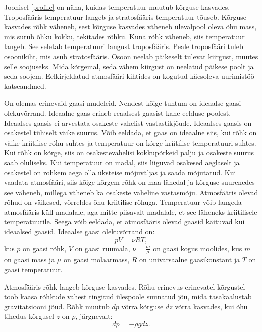 \documentclass{trkut}%
\begin{document}
Joonisel \ref{profile} on näha, kuidas temperatuur muutub kõrguse kasvades. Troposfääris temperatuur langeb ja stratosfääris temperatuur tõuseb. Kõrguse kasvades rõhk väheneb, sest kõrguse kasvades väheneb ülevalpool oleva õhu mass, mis surub õhku kokku, tekitades rõhku. Kuna rõhk väheneb, siis temperatuur langeb. See seletab temperatuuri langust troposfääris. Peale troposfääri tuleb osoonikiht, mis asub stratosfääris. Osoon neelab päikeselt tulevat kiirgust, muutes selle soojuseks. Mida kõrgemal, seda vähem kiirgust on neelatud päikese poolt ja seda soojem. Eelkirjeldatud atmosfääri kihtides on kogutud käesoleva uurimistöö katseandmed.

On olemas erinevaid gaasi mudeleid. Nendest kõige tuntum on ideaalse gaasi olekuvõrrand. Ideaalne gaas erineb reaalsest gaasist kahe eelduse poolest. Ideaalses gaasis ei arvestata osakeste vahelist vastastikjõude. Ideaalses gaasis on osakestel tühiselt väike suurus. Võib eeldada, et gaas on ideaalne siis, kui rõhk on väike kriitilise rõhu suhtes ja temperatuur on kõrge kriitilise temperatuuri suhtes. Kui rõhk on kõrge, siis on osakestevahelisi kokkupõrkeid palju ja osakeste suurus saab oluliseks. Kui temperatuur on madal, siis liiguvad osakesed aeglaselt ja osakestel on rohkem aega olla üksteise mõjuväljas ja saada mõjutatud. Kui vaadata atmosfääri, siis kõige kõrgem rõhk on maa lähedal ja kõrguse suurenedes see väheneb, millega väheneb ka osakeste vaheline vastasmõju. Atmosfääris olevad rõhud on väikesed, võrreldes õhu kriitilise rõhuga. Temperatuur võib langeda atmosfääris küll madalale, aga mitte piisavalt madalale, et see läheneks kriitilisele temperatuurile. Seega võib eeldada, et atmosfääris olevad gaasid käituvad kui ideaalsed gaasid. Ideaalse gaasi olekuvõrrand on:
\begin{equation}\label{eq8}
pV=\nu RT ,
\end{equation}
kus $p$ on gaasi rõhk, $V$ on gaasi ruumala, $\nu = \frac{m}{\mu}$ on gaasi kogus moolides, kus $m$ on gaasi mass ja $\mu$ on gaasi molaarmass, $R$ on univarsaalne gaasikonstant ja $T$ on gaasi temperatuur.

Atmosfääris rõhk langeb kõrguse kasvades. Rõhu erinevus erinevatel kõrgustel toob kaasa rõhkude vahest tingitud ülespoole suunatud jõu, mida tasakaalustab gravitatsiooni jõud. Rõhk muutub $dp$ võrra kõrguse $dz$ võrra kasvades, kui õhu tihedus kõrgusel $z$ on $\rho$, järgnevalt:
\begin{equation}\label{eq10}
dp=-\rho gdz.   
\end{equation}
\end{document}
